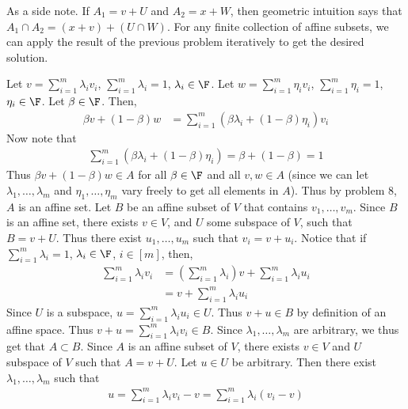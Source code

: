 \documentclass{book}
\begin{document}
\begin{enumerate}[label=\arabic*)]
      As a side note. If $A_1 = v + U$ and $A_2 = x + W$, then geometric intuition says that $A_1 \cap A_2 = (x + v) + (U \cap W)$.
    \ii
      For any finite collection of affine subsets, we can apply the result of the previous problem iteratively to get the desired solution.
    \ii
      \begin{enumerate}[label=\alph*)]
        \ii 
          Let $v = \sum_{i = 1}^{m}\lambda_iv_i$, $\sum_{i = 1}^{m}\lambda_i = 1$, $\lambda_i \in \F$. Let $w = \sum_{i = 1}^{m}\eta_iv_i$, $\sum_{i = 1}^{m}\eta_i = 1$, $\eta_i \in \F$. Let
          $\beta \in \F$. Then,
          \begin{align*}
            \beta v + (1 - \beta)w & = \sum_{i = 1}^{m}(\beta\lambda_i + (1 - \beta)\eta_i)v_i
          \end{align*}
          Now note that 
          \begin{align*}
            \sum_{i = 1}^{m}(\beta\lambda_i + (1 - \beta)\eta_i) = \beta + (1 - \beta) = 1
          \end{align*}
          Thus $\beta v + (1 - \beta)w \in A$ for all $\beta \in \F$ and all $v, w \in A$ (since we can let $\lambda_1, \dots, \lambda_m$ and $\eta_1, \dots, \eta_m$ vary freely to get all
          elements in $A$). Thus by problem $8$, $A$ is an affine set.
        \ii
          Let $B$ be an affine subset of $V$ that contains $v_1, \dots, v_m$. Since $B$ is an affine set, there exists $v \in V$, and $U$ some subspace of $V$, such that $B = v + U$. Thus
          there exist $u_1, \dots, u_m$ such that $v_i = v + u_i$. Notice that if $\sum_{i = 1}^{m}\lambda_i = 1$, $\lambda_i \in \F$, $i \in [m]$, then,
          \begin{align*}
            \sum_{i = 1}^{m}\lambda_iv_i & = (\sum_{i = 1}^{m}\lambda_i)v + \sum_{i = 1}^{m}\lambda_iu_i \\
            & = v + \sum_{i = 1}^{m}\lambda_iu_i
          \end{align*}
          Since $U$ is a subspace, $u = \sum_{i = 1}^{m}\lambda_iu_i \in U$. Thus $v + u \in B$ by definition of an affine space. Thus $v + u = \sum_{i = 1}^{m}\lambda_iv_i \in B$. Since
          $\lambda_1, \dots, \lambda_m$ are arbitrary, we thus get that $A \subset B$.
        \ii
          Since $A$ is an affine subset of $V$, there exists $v \in V$ and $U$ subspace of $V$ such that $A = v + U$. Let $u \in U$ be arbitrary. Then there exist $\lambda_1, \dots,
          \lambda_m$ such that
          \begin{align*}
            u = \sum_{i = 1}^{m}\lambda_iv_i - v = \sum_{i = 1}^{m}\lambda_i(v_i - v)

\end{align*}
\end{enumerate}
\end{enumerate}
\end{document}
